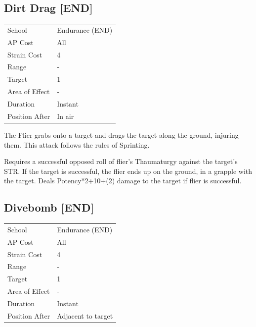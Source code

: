 \documentclass[11pt,a4paper,twocolumn]{book}
\begin{document}
\subsection*{Dirt Drag [END]}
{
	\begin{tabu} to 75mm{| X[l,4] | X[l,7] |}
		\hline
		School 			& Endurance (END) 	\\
        AP Cost	      	& All 				\\
        Strain Cost     & 4 				\\
        Range     		& - 				\\
        Target      	& 1 				\\
        Area of Effect  & - 	 			\\
        Duration     	& Instant 	 		\\
		Position After  & In air 			\\ \hline
	\end{tabu}
		
}

\medskip

The Flier grabs onto a target and drags the target along the ground, injuring them. This attack follows the rules of Sprinting.

Requires a successful opposed roll of flier's Thaumaturgy against the target's STR. If the target is successful, the flier ends up on the ground, in a grapple with the target. Deals Potency*2+10+(2) damage to the target if flier is successful.


\subsection*{Divebomb [END]}
{
	\begin{tabu} to 75mm{| X[l,4] | X[l,7] |}
		\hline
		School 			& Endurance (END) 	\\
        AP Cost	      	& All 				\\
        Strain Cost     & 4 				\\
        Range     		& - 				\\
        Target      	& 1 				\\
        Area of Effect  & - 	 			\\
        Duration     	& Instant 	 		\\
		Position After  & Adjacent to target 	\\ \hline
	\end{tabu}
		
}
\end{document}
